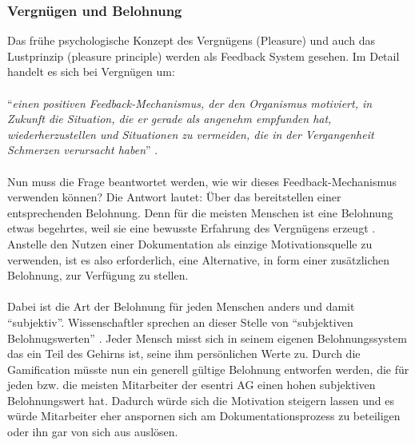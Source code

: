 \documentclass[a4paper,12pt,twoside]{scrartcl}
\begin{document}
\subsubsection{Vergnügen und Belohnung}
Das frühe psychologische Konzept des Vergnügens (Pleasure) und auch das Lustprinzip (pleasure principle) werden als Feedback System gesehen. Im Detail handelt es sich bei Vergnügen um:
\\\\
\enquote{\textit{einen positiven Feedback-Mechanismus, der den Organismus motiviert, in Zukunft die Situation, die er gerade als angenehm empfunden hat, wiederherzustellen und Situationen zu vermeiden, die in der Vergangenheit Schmerzen verursacht haben}} \cite{Freud2015}.
\\\\
Nun muss die Frage beantwortet werden, wie wir dieses Feedback-Mechanismus verwenden können? Die Antwort lautet: Über das bereitstellen einer entsprechenden Belohnung. Denn für die meisten Menschen ist eine Belohnung etwas begehrtes, weil sie eine bewusste Erfahrung des Vergnügens erzeugt \cite{Berridge2009}. Anstelle den Nutzen einer Dokumentation als einzige Motivationsquelle zu verwenden, ist es also erforderlich, eine Alternative, in form einer zusätzlichen Belohnung, zur Verfügung zu stellen.
\\\\
Dabei ist die Art der Belohnung für jeden Menschen anders und damit \enquote{subjektiv}. Wissenschaftler sprechen an dieser Stelle von \enquote{subjektiven Belohnugswerten} \cite{Bonhoeffer2011}. Jeder Mensch misst sich in seinem eigenen Belohnungssystem das ein Teil des Gehirns ist, seine ihm persönlichen Werte zu. Durch die Gamification müsste nun ein generell gültige Belohnung entworfen werden, die für jeden bzw. die meisten Mitarbeiter der esentri AG einen hohen subjektiven Belohnungswert hat. Dadurch würde sich die Motivation steigern lassen und es würde Mitarbeiter eher anspornen sich am Dokumentationsprozess zu beteiligen oder ihn gar von sich aus auslösen.
\end{document}

